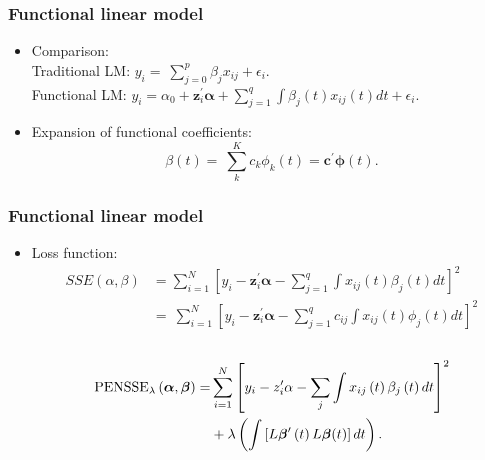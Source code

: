 \documentclass[
	9pt, %
]{beamer}
\begin{document}
\begin{frame}
	\frametitle{Functional linear model}
	\begin{itemize}
	\item Comparison: \\
	Traditional LM: $y_i=\ \sum_{j=0}^{p}\beta_j{x_{ij}}+\epsilon_i.$
	\\	
	Functional LM: $y_i=\alpha_0+\bm{z}_{i}^\prime\bm{\alpha}+ \sum_{j=1}^{q}\int\beta_j(t){x_{ij}\left(t\right)dt}+\epsilon_i$.
	\bigskip
	\item Expansion of functional coefficients:
	$$\beta\left(t\right)=\ \sum_{k}^{K}{c_k\phi_k\left(t\right)}=\bm{c}^\prime\bm{\phi}\left(t\right).$$	
	
	\end{itemize}
	\end{frame}
\begin{frame}
	\frametitle{Functional linear model}
	\begin{itemize}
	\item Loss function:
	\begin{align*}
	SSE\left(\alpha,\beta\right)&=\sum_{i=1}^N\left[y_i-\bm{z}_{i}^\prime\bm{\alpha}-\sum_{j=1}^{q}\int x_{ij}\left(t\right)\beta_j\left(t\right)dt\right]^2\\
	&=\ \sum_{i=1}^{N}\left[y_i-\bm{z}_{i}^\prime\bm{\alpha}-\sum_{j=1}^{q}c_{ij}\int x_{ij}\left(t\right)\phi_j\left(t\right)dt\right]^2
	\end{align*}
	\\	
	\begin{align*}
	{\rm PENSSE}_\lambda\left(\bm \alpha,\bm \beta\right)=
	&\sum_{i=1}^N\left[y_i-z_i'\alpha-\sum_{j}\int{x_{ij}\left(t\right)\beta_j\left(t\right)dt}\right]^2\\
	&+\lambda\left(\int{\left[L \bm \beta'\left(t\right) L\bm \beta (t) \right]dt}\right).
	\end{align*}

	\end{itemize}
	\end{frame}
\end{document}
